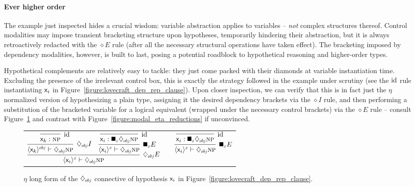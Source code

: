 \paragraph{Ever higher order}
The example just inspected hides a crucial wisdom: variable abstraction applies to variables -- \textit{not} complex structures thereof.
Control modalities may impose transient bracketing structure upon hypotheses, temporarily hindering their abstraction, but it is always retroactively redacted with the $\diamond E$ rule (after all the necessary structural operations have taken effect).
The bracketing imposed by dependency modalities, however, is built to last, posing a potential roadblock to hypothetical reasoning and higher-order types.

Hypothetical complements are relatively easy to tackle: they just come packed with their diamonds at variable instantiation time.
Excluding the presence of the irrelevant control box, this is exactly the strategy followed in the example under scrutiny (see the $\mathrm{id}$ rule instantiating $\mathsf{x}_{\mathnormal{i}}$ in Figure~\ref{figure:lovecraft_dep_rep_clause}).
Upon closer inspection, we can verify that this is in fact just the $\eta$ normalized version of hypothesizing a plain type, assigning it the desired dependency brackets via the $\diamond I$ rule, and then performing a substitution of the bracketed variable for a logical equivalent (wrapped under the necessary control brackets) via the $\diamond E$ rule -- consult Figure~\ref{figure:eta_normalized_complement_hypothesis} and contrast with Figure~\ref{figure:modal_eta_reductions} if unconvinced.

\begin{figure}
	\begin{tabularx}{0.9\textwidth}{@{}cCc@{}}
	$
		\infer[\ddia{obj} E]{\dbra{\vari}{x} \vdash \ddia{obj}\np}{
			\infer[\ddia{obj} I]{\dbra{\vark}{obj} \vdash \ddia{obj}\np}{
				\infer[\Ax]{\vark : \np}{}
			}
			&
			\infer[\dxbox{x} E]{\dbra{\vari}{x} \vdash \ddia{obj}\np}{
				\infer[\Ax]{\vari : \dxbox{x}\ddia{obj}\np}{}
			}
		}
	$
	&
	\raisebox{10pt}{$\overset{\eta}{\equiv}$}
	&
	$
		\infer[\dxbox{x} E]{\dbra{\vari}{x} \vdash \ddia{obj} \np}{\infer[\Ax]{\vari : \dxbox{x}\ddia{obj}\np}{}}
	$
	\end{tabularx}
	\caption{$\eta$ long form of the $\ddia{obj}$ connective of hypothesis $\mathsf{x}_{\mathnormal{i}}$  in Figure~\ref{figure:lovecraft_dep_rep_clause}.}
	\label{figure:eta_normalized_complement_hypothesis}
\end{figure}

